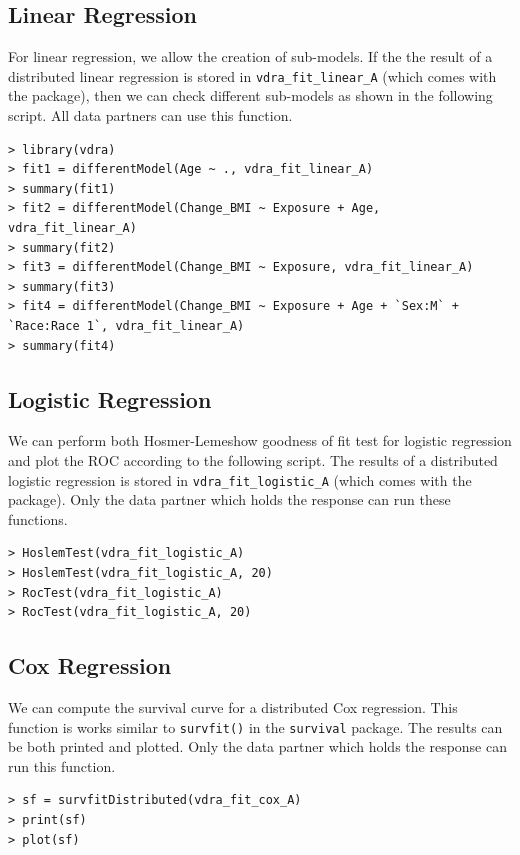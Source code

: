 \documentclass[12]{article}
\begin{document}
\subsection{Linear Regression}

For linear regression, we allow the creation of sub-models.  If the the result of a distributed linear regression is stored in \verb"vdra_fit_linear_A" (which comes with the package), then we can check different sub-models as shown in the following script.  All data partners can use this function.

\begin{verbatim}
> library(vdra)
> fit1 = differentModel(Age ~ ., vdra_fit_linear_A)
> summary(fit1)
> fit2 = differentModel(Change_BMI ~ Exposure + Age, vdra_fit_linear_A)
> summary(fit2)
> fit3 = differentModel(Change_BMI ~ Exposure, vdra_fit_linear_A)
> summary(fit3)
> fit4 = differentModel(Change_BMI ~ Exposure + Age + `Sex:M` + `Race:Race 1`, vdra_fit_linear_A)
> summary(fit4)
\end{verbatim}


\subsection{Logistic Regression}

We can perform both Hosmer-Lemeshow goodness of fit test for logistic regression and plot the ROC according to the following script.  The results of a distributed logistic regression is stored in \verb"vdra_fit_logistic_A" (which comes with the package).  Only the data partner which holds the response can run these functions.

\begin{verbatim}
> HoslemTest(vdra_fit_logistic_A)
> HoslemTest(vdra_fit_logistic_A, 20)
> RocTest(vdra_fit_logistic_A)
> RocTest(vdra_fit_logistic_A, 20)
\end{verbatim}

\subsection{Cox Regression}

We can compute the survival curve for a distributed Cox regression.  This function is works similar to \verb"survfit()" in the \verb"survival" package.  The results can be both printed and plotted.  Only the data partner which holds the response can run this function.

\begin{verbatim}
> sf = survfitDistributed(vdra_fit_cox_A)
> print(sf)
> plot(sf)
\end{verbatim}
\end{document}
